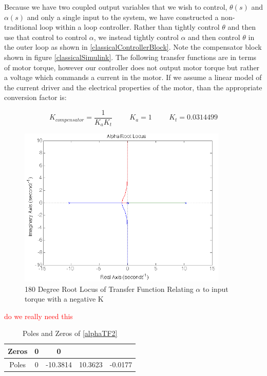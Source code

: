 \documentclass{article}
\newcommand{\xxx}[1]{\textcolor{red}{#1}}
\theoremstyle{plain}
\theoremstyle{definition}
\theoremstyle{remark}
\begin{document}
Because we have two coupled output variables that we wish to control, $\theta(s)$ and $\alpha(s)$ and only a single input to the system, we have constructed a non-traditional loop within a loop controller.  Rather than tightly control $\theta$ and then use that control to control $\alpha$, we instead tightly control $\alpha$ and then control $\theta$ in the outer loop as shown in \ref{classicalControllerBlock}.  Note the compensator block shown in figure \ref{classicalSimulink}.  The following transfer functions are in terms of motor torque, however our controller does not output motor torque but rather a voltage which commands a current in the motor. If we assume a linear model of the current driver and the electrical properties of the motor, than the appropriate conversion factor is:

$$ K_{compensator} = \frac{1}{K_a K_t} \hspace{1cm} K_a = 1 \hspace{1cm}  K_t = 0.0314499 $$

\begin{figure}
\begin{center}
\includegraphics[width = 10cm]{alpha-1closedLoop.png}
\end{center}
\caption{180 Degree Root Locus of Transfer Function Relating $\alpha$ to input torque with a negative K}
\label{q8alphaInit}
\end{figure}

\xxx{do we really need this}
\begin{table}
\begin{center}
    \begin{tabular}{|c|c|c|c|c|}
        \hline
        Zeros & 0 & 0        & ~       & ~       \\ \hline
        Poles & 0 & -10.3814 & 10.3623 & -0.0177 \\
        \hline
    \end{tabular}
\caption{Poles and Zeros of \eqref{alphaTF2}}
\label{Alpharoots}
\end{center}
\end{table}
\end{document}
